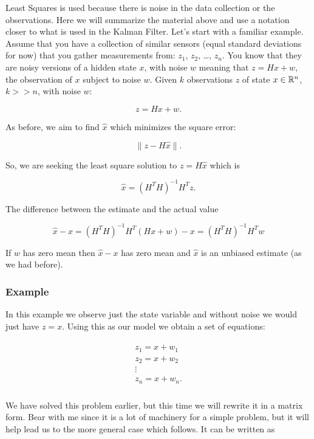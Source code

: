 Least Squares is used because there is noise in the data collection or
the observations. Here we will summarize the material above and use a
notation closer to what is used in the Kalman Filter. Let's start with a
familiar example. Assume that you have a collection of similar sensors
(equal standard deviations for now) that you gather measurements from:
\(z_1\), \(z_2\), \ldots, \(z_n\). You know that they are noisy versions
of a hidden state \(x\), with noise \(w\) meaning that \(z = Hx + w\),
the observation of \(x\) subject to noise \(w\). Given \(k\)
observations \(z\) of state \(x\in{\Bbb R}^n\), \(k>>n\), with noise
\(w\):

\[z = Hx+w.\]

As before, we aim to find \(\hat{x}\) which minimizes the square error:

\[\| z - H\hat{x}\|.\]

So, we are seeking the least square solution to \(z = H\hat{x}\) which
is

\[\hat{x} = \left(H^TH\right)^{-1} H^T z.\]

The difference between the estimate and the actual value

\[\hat{x}-x = \left(H^TH\right)^{-1} H^T (Hx+w) -x
= \left(H^TH\right)^{-1} H^T w\]

If \(w\) has zero mean then \(\hat{x}-x\) has zero mean and \(\hat{x}\)
is an unbiased estimate (as we had before).

\hypertarget{example}{%
\subsubsection{Example}\label{example}}

In this example we observe just the state variable and without noise we
would just have \(z  = x\). Using this as our model we obtain a set of
equations:

\[\begin{aligned}
\begin{array}{c}
z_1 = x + w_1 \\
z_2 = x  + w_2\\
\vdots \\
z_n = x + w_n.\\
\end{array}
\end{aligned}\]

We have solved this problem earlier, but this time we will rewrite it in
a matrix form. Bear with me since it is a lot of machinery for a simple
problem, but it will help lead us to the more general case which
follows. It can be written as

